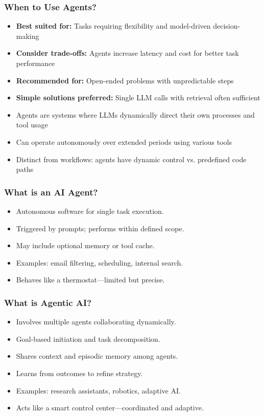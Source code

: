 \begin{frame}[fragile]\frametitle{When to Use Agents?}
\begin{itemize}
    \item \textbf{Best suited for:} Tasks requiring flexibility and model-driven decision-making
    \item \textbf{Consider trade-offs:} Agents increase latency and cost for better task performance
    \item \textbf{Recommended for:} Open-ended problems with unpredictable steps
    \item \textbf{Simple solutions preferred:} Single LLM calls with retrieval often sufficient
    \item Agents are systems where LLMs dynamically direct their own processes and tool usage
    \item Can operate autonomously over extended periods using various tools
    \item Distinct from workflows: agents have dynamic control vs. predefined code paths
\end{itemize}
\end{frame}

\begin{frame}[fragile]\frametitle{What is an AI Agent?}
    \begin{itemize}
        \item Autonomous software for single task execution.
        \item Triggered by prompts; performs within defined scope.
        \item May include optional memory or tool cache.
        \item Examples: email filtering, scheduling, internal search.
        \item Behaves like a thermostat—limited but precise.
    \end{itemize}
\end{frame}

\begin{frame}[fragile]\frametitle{What is Agentic AI?}
    \begin{itemize}
        \item Involves multiple agents collaborating dynamically.
        \item Goal-based initiation and task decomposition.
        \item Shares context and episodic memory among agents.
        \item Learns from outcomes to refine strategy.
        \item Examples: research assistants, robotics, adaptive AI.
        \item Acts like a smart control center—coordinated and adaptive.
    \end{itemize}
\end{frame}

